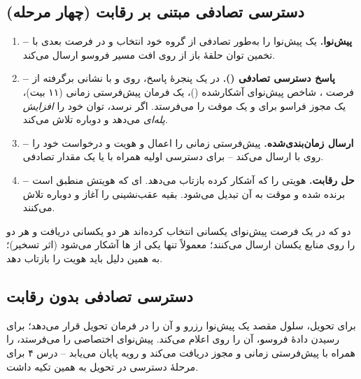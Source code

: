 \documentclass[11pt,a4paper]{article}
\begin{document}
\subsection{دسترسی تصادفی مبتنی بر رقابت (چهار مرحله)}
\begin{enumerate}
  \item \textbf{ -- پیش‌نوا.}  یک پیش‌نوا را به‌طور تصادفی از گروه خود انتخاب و در فرصت
         بعدی با تخمین توان حلقهٔ باز از روی افت مسیر فروسو ارسال می‌کند.
  \item \textbf{ -- پاسخ دسترسی تصادفی ().}  در یک پنجرهٔ پاسخ، روی  و با
        نشانی  برگرفته از فرصت ، شاخص پیش‌نوای آشکارشده ()، یک فرمان پیش‌فرستی
        زمانی (۱۱ بیت)، یک مجوز فراسو برای  و یک  موقت را می‌فرستد. اگر  نرسد،
         توان خود را \emph{افزایش پله‌ای} می‌دهد و دوباره تلاش می‌کند.
  \item \textbf{ -- ارسال زمان‌بندی‌شده.}  پیش‌فرستی زمانی را اعمال و هویت و درخواست خود را روی
         با  ارسال می‌کند -- برای دسترسی اولیه  همراه با
         یا یک مقدار تصادفی.
  \item \textbf{ -- حل رقابت.}  هویتی را که آشکار کرده بازتاب می‌دهد. ای که هویتش
        منطبق است برنده شده و  موقت به  آن تبدیل می‌شود. بقیه عقب‌نشینی را آغاز و دوباره تلاش می‌کنند.
\end{enumerate}
دو  که در یک فرصت پیش‌نوای یکسانی انتخاب کرده‌اند هر دو  یکسانی دریافت و هر دو  را
روی منابع یکسان ارسال می‌کنند؛ معمولاً تنها یکی از ها آشکار می‌شود (اثر تسخیر)؛ به همین دلیل
 باید هویت را بازتاب دهد.

\subsection{دسترسی تصادفی بدون رقابت}
برای تحویل، سلول مقصد یک پیش‌نوا رزرو و آن را در فرمان تحویل قرار می‌دهد؛ برای رسیدن دادهٔ فروسو، 
آن را روی  اعلام می‌کند.  پیش‌نوای اختصاصی را می‌فرستد،  را همراه با پیش‌فرستی
زمانی و مجوز دریافت می‌کند و رویه پایان می‌یابد -- درس ۴ برای مرحلهٔ دسترسی در تحویل  به همین تکیه داشت.
\end{document}

